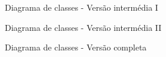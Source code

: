 \begin{figure}[H]
  \centering
  \resizebox{\textwidth}{!}{%
  }
  \caption{Diagrama de classes - Versão intermédia I}
  \label{fig:minimalista_v2}
\end{figure}

\begin{figure}[H]
  \centering
  \resizebox{\textwidth}{!}{%
  }
  \caption{Diagrama de classes - Versão intermédia II}
  \label{fig:minimalista}
\end{figure}

\begin{figure}[H]
  \centering
  \resizebox{\textwidth}{!}{%
  }
  \caption{Diagrama de classes - Versão completa}
  \label{fig:completo}
\end{figure}

